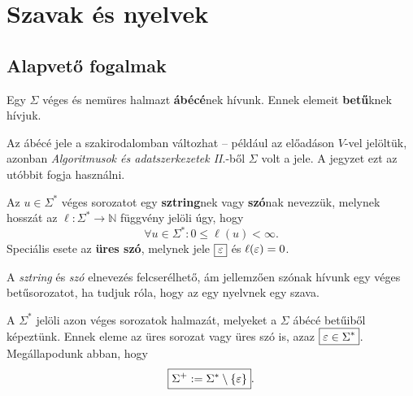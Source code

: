 


\chapter{Szavak és nyelvek}

\section{Alapvető fogalmak}

\begin{tcolorbox}
	\begin{definition}[Ábécé]
		Egy $\Sigma$ véges és nemüres halmazt \textbf{ábécé}nek hívunk.
		Ennek elemeit \textbf{betű}knek hívjuk.
	\end{definition}
\end{tcolorbox}

Az ábécé jele a szakirodalomban változhat -- például az előadáson $V$-vel jelöltük, azonban \textit{Algoritmusok és adatszerkezetek II}.-ből $\Sigma$ volt a jele. A jegyzet ezt az utóbbit fogja használni.

\begin{tcolorbox}
	\begin{definition}
		Az $u \in \Sigma^*$ véges sorozatot egy \textbf{sztring}nek vagy \textbf{szó}nak nevezzük, melynek hosszát az $\ell : \Sigma^* \to \mathbb{N}$ függvény jelöli úgy, hogy \[ \forall u \in \Sigma^* : 0 \leq \ell(u) < \infty. \] Speciális esete az \textbf{üres szó}, melynek jele $\boxed{\varepsilon}$ és $\ell(\varepsilon) = 0$.
	\end{definition}
\end{tcolorbox}

A \textit{sztring} és \textit{szó} elnevezés felcserélhető, ám jellemzően szónak hívunk egy véges betűsorozatot, ha tudjuk róla, hogy az egy nyelvnek egy szava.

A $\Sigma^*$ jelöli azon véges sorozatok halmazát, melyeket a $\Sigma$ ábécé betűiből képeztünk. Ennek eleme az üres sorozat vagy üres szó is, azaz $\boxed{\varepsilon \in \Sigma^*}$. Megállapodunk abban, hogy \[ \boxed{\Sigma^+ := \Sigma^* \setminus \{ \varepsilon \}} . \]

